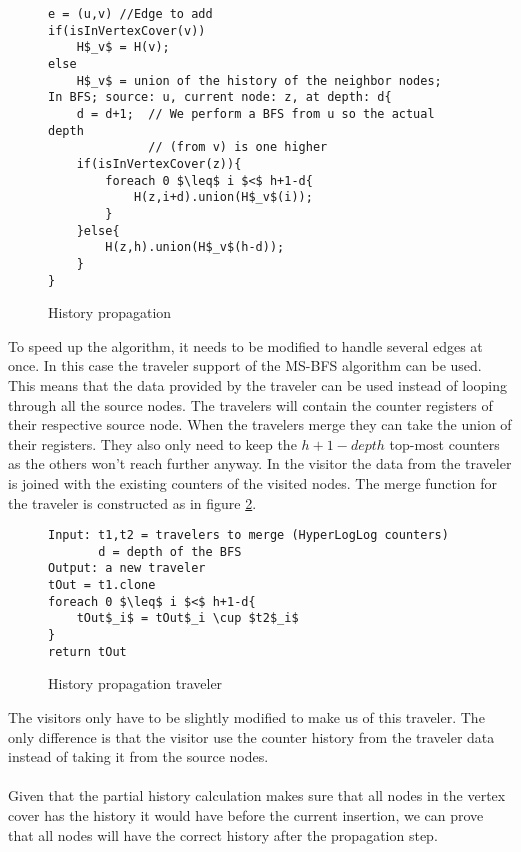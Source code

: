 \begin{figure}[h]
    \begin{lstlisting}[mathescape]
e = (u,v) //Edge to add
if(isInVertexCover(v))
    H$_v$ = H(v);
else
    H$_v$ = union of the history of the neighbor nodes;
In BFS; source: u, current node: z, at depth: d{
    d = d+1;  // We perform a BFS from u so the actual depth 
              // (from v) is one higher
    if(isInVertexCover(z)){
        foreach 0 $\leq$ i $<$ h+1-d{
            H(z,i+d).union(H$_v$(i));
        }
    }else{
        H(z,h).union(H$_v$(h-d));
    }
}
    \end{lstlisting}
    \caption{History propagation}
    \label{fig:history_propagation_algorithm}
\end{figure}

To speed up the algorithm, it needs to be modified to handle several edges at once. In this case the traveler support of the MS-BFS algorithm can be used. This means that the data provided by the traveler can be used instead of looping through all the source nodes. The travelers will contain the counter registers of their respective source node. When the travelers merge they can take the union of their registers. They also only need to keep the $h+1-depth$ top-most counters as the others won't reach further anyway. In the visitor the data from the traveler is joined with the existing counters of the visited nodes. The merge function for the traveler is constructed as in figure \ref{fig:history_propagation_traveler}.

\begin{figure}[h]
    \begin{lstlisting}[mathescape]
Input: t1,t2 = travelers to merge (HyperLogLog counters)
       d = depth of the BFS
Output: a new traveler
tOut = t1.clone
foreach 0 $\leq$ i $<$ h+1-d{
    tOut$_i$ = tOut$_i \cup $t2$_i$
}
return tOut
    \end{lstlisting}
    \caption{History propagation traveler}
    \label{fig:history_propagation_traveler}
\end{figure}

The visitors only have to be slightly modified to make us of this traveler. The only difference is that the visitor use the counter history from the traveler data instead of taking it from the source nodes.\\\\

Given that the partial history calculation makes sure that all nodes in the vertex cover has the history it would have before the current insertion, we can prove that all nodes will have the correct history after the propagation step. \\

